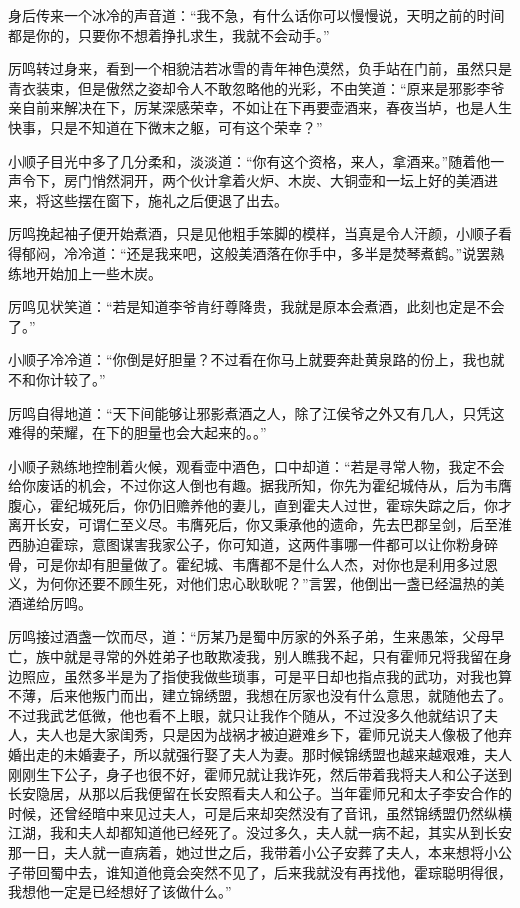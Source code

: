 身后传来一个冰冷的声音道：“我不急，有什么话你可以慢慢说，天明之前的时间都是你的，只要你不想着挣扎求生，我就不会动手。”

厉鸣转过身来，看到一个相貌洁若冰雪的青年神色漠然，负手站在门前，虽然只是青衣装束，但是傲然之姿却令人不敢忽略他的光彩，不由笑道：“原来是邪影李爷亲自前来解决在下，厉某深感荣幸，不如让在下再要壶酒来，春夜当垆，也是人生快事，只是不知道在下微末之躯，可有这个荣幸？”

小顺子目光中多了几分柔和，淡淡道：“你有这个资格，来人，拿酒来。”随着他一声令下，房门悄然洞开，两个伙计拿着火炉、木炭、大铜壶和一坛上好的美酒进来，将这些摆在窗下，施礼之后便退了出去。

厉鸣挽起袖子便开始煮酒，只是见他粗手笨脚的模样，当真是令人汗颜，小顺子看得郁闷，冷冷道：“还是我来吧，这般美酒落在你手中，多半是焚琴煮鹤。”说罢熟练地开始加上一些木炭。

厉鸣见状笑道：“若是知道李爷肯纡尊降贵，我就是原本会煮酒，此刻也定是不会了。”

小顺子冷冷道：“你倒是好胆量？不过看在你马上就要奔赴黄泉路的份上，我也就不和你计较了。”

厉鸣自得地道：“天下间能够让邪影煮酒之人，除了江侯爷之外又有几人，只凭这难得的荣耀，在下的胆量也会大起来的。。”

小顺子熟练地控制着火候，观看壶中酒色，口中却道：“若是寻常人物，我定不会给你废话的机会，不过你这人倒也有趣。据我所知，你先为霍纪城侍从，后为韦膺腹心，霍纪城死后，你仍旧赡养他的妻儿，直到霍夫人过世，霍琮失踪之后，你才离开长安，可谓仁至义尽。韦膺死后，你又秉承他的遗命，先去巴郡呈剑，后至淮西胁迫霍琮，意图谋害我家公子，你可知道，这两件事哪一件都可以让你粉身碎骨，可是你却有胆量做了。霍纪城、韦膺都不是什么人杰，对你也是利用多过恩义，为何你还要不顾生死，对他们忠心耿耿呢？”言罢，他倒出一盏已经温热的美酒递给厉鸣。

厉鸣接过酒盏一饮而尽，道：“厉某乃是蜀中厉家的外系子弟，生来愚笨，父母早亡，族中就是寻常的外姓弟子也敢欺凌我，别人瞧我不起，只有霍师兄将我留在身边照应，虽然多半是为了指使我做些琐事，可是平日却也指点我的武功，对我也算不薄，后来他叛门而出，建立锦绣盟，我想在厉家也没有什么意思，就随他去了。不过我武艺低微，他也看不上眼，就只让我作个随从，不过没多久他就结识了夫人，夫人也是大家闺秀，只是因为战祸才被迫避难乡下，霍师兄说夫人像极了他弃婚出走的未婚妻子，所以就强行娶了夫人为妻。那时候锦绣盟也越来越艰难，夫人刚刚生下公子，身子也很不好，霍师兄就让我诈死，然后带着我将夫人和公子送到长安隐居，从那以后我便留在长安照看夫人和公子。当年霍师兄和太子李安合作的时候，还曾经暗中来见过夫人，可是后来却突然没有了音讯，虽然锦绣盟仍然纵横江湖，我和夫人却都知道他已经死了。没过多久，夫人就一病不起，其实从到长安那一日，夫人就一直病着，她过世之后，我带着小公子安葬了夫人，本来想将小公子带回蜀中去，谁知道他竟会突然不见了，后来我就没有再找他，霍琮聪明得很，我想他一定是已经想好了该做什么。”

